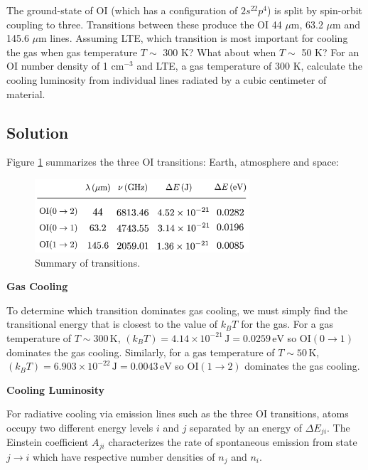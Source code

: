 \documentclass[12pt]{article}
\begin{document}
The ground-state of $\mathrm{OI}$ (which has a configuration of $2s^22p^4$) is split by spin-orbit coupling to three. Transitions between these produce the $\mathrm{OI}$ 44 $\mu$m, 63.2 $\mu$m and 145.6 $\mu$m lines. Assuming LTE, which transition is most important for cooling the gas when gas temperature $T \sim$ 300 K? What about when $T \sim$ 50 K? For an $\mathrm{OI}$ number density of 1 cm$^{-3}$ and LTE, a gas temperature of 300 K, calculate the cooling luminosity from individual lines radiated by a cubic centimeter of material.


\subsection*{Solution}

Figure \ref{fig:table1} summarizes the three $\mathrm{OI}$ transitions: Earth, atmosphere and space:

\begin{figure}[h] \label{fig:table1}
\includegraphics[width=8cm]{table1.png}
\centering
\caption{Summary of transitions.}
\end{figure}

{\noindent}\textbf{Gas Cooling}

To determine which transition dominates gas cooling, we must simply find the transitional energy that is closest to the value of $k_BT$ for the gas. For a gas temperature of $T\sim300\,\mathrm{K}$, $(k_BT)=4.14\times10^{-21}\,\mathrm{J} = 0.0259\,\mathrm{eV}$ so $\mathrm{OI(0\rightarrow1)}$ dominates the gas cooling. Similarly, for a gas temperature of $T\sim50\,\mathrm{K}$, $(k_BT)=6.903\times10^{-22}\,\mathrm{J} = 0.0043\,\mathrm{eV}$ so $\mathrm{OI(1\rightarrow2)}$ dominates the gas cooling.

{\noindent}\textbf{Cooling Luminosity}

For radiative cooling via emission lines such as the three $\mathrm{OI}$ transitions, atoms occupy two different energy levels $i$ and $j$ separated by an energy of $\Delta E_{ji}$. The Einstein coefficient $A_{ji}$ characterizes the rate of spontaneous emission from state $j\rightarrow i$ which have respective number densities of $n_j$ and $n_i$.
\end{document}
